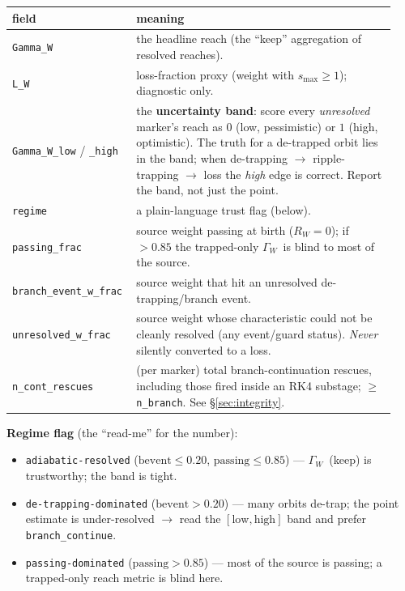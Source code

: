 \documentclass[11pt]{article}
\newcommand{\code}[1]{\texttt{#1}}
\newcommand{\GW}{\ensuremath{\Gamma_W}}
\begin{document}
\begin{center}\small
\begin{tabular}{@{}p{0.28\linewidth}p{0.66\linewidth}@{}}
\toprule
field & meaning \\
\midrule
\code{Gamma\_W} & the headline reach (the ``keep'' aggregation of resolved reaches). \\
\code{L\_W} & loss-fraction proxy (weight with $s_{\max}\ge1$); diagnostic only. \\
\code{Gamma\_W\_low} / \code{\_high} & the \textbf{uncertainty band}: score every
   \emph{unresolved} marker's reach as $0$ (low, pessimistic) or $1$ (high, optimistic). The
   truth for a de-trapped orbit lies in the band; when de-trapping $\to$ ripple-trapping $\to$
   loss the \emph{high} edge is correct. Report the band, not just the point. \\
\code{regime} & a plain-language trust flag (below). \\
\code{passing\_frac} & source weight passing at birth ($R_W=0$); if $>0.85$ the trapped-only
   \GW\ is blind to most of the source. \\
\code{branch\_event\_w\_frac} & source weight that hit an unresolved de-trapping/branch event. \\
\code{unresolved\_w\_frac} & source weight whose characteristic could not be cleanly resolved
   (any event/guard status). \emph{Never} silently converted to a loss. \\
\code{n\_cont\_rescues} & (per marker) total branch-continuation rescues, including those fired
   inside an RK4 substage; $\ge$ \code{n\_branch}. See \S\ref{sec:integrity}. \\
\bottomrule
\end{tabular}
\end{center}

\textbf{Regime flag} (the ``read-me'' for the number):
\begin{itemize}[nosep]
  \item \code{adiabatic-resolved} ($\mathrm{bevent}\le0.20$, $\mathrm{passing}\le0.85$) --- \GW\
        (keep) is trustworthy; the band is tight.
  \item \code{de-trapping-dominated} ($\mathrm{bevent}>0.20$) --- many orbits de-trap; the point
        estimate is under-resolved $\to$ read the $[\mathrm{low,high}]$ band and prefer
        \code{branch\_continue}.
  \item \code{passing-dominated} ($\mathrm{passing}>0.85$) --- most of the source is passing; a
        trapped-only reach metric is blind here.
\end{itemize}
\end{document}
